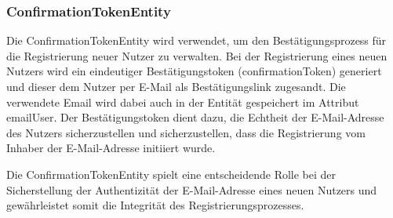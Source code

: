 \documentclass[fontsize=12pt,openright,oneside,paper=a4,BCOR=1cm]{scrbook}
\begin{document}
\subsubsection{ConfirmationTokenEntity}
Die \glqq ConfirmationTokenEntity\grqq{} wird verwendet, um den Bestätigungsprozess für die Registrierung neuer Nutzer zu verwalten. Bei der Registrierung eines neuen Nutzers wird ein eindeutiger Bestätigungstoken (\glqq confirmationToken\grqq{}) generiert und dieser dem Nutzer per E-Mail als Bestätigungslink zugesandt. Die verwendete Email wird dabei auch in der Entität gespeichert im Attribut \glqq emailUser\grqq{}. Der Bestätigungstoken dient dazu, die Echtheit der E-Mail-Adresse des Nutzers sicherzustellen und sicherzustellen, dass die Registrierung vom Inhaber der E-Mail-Adresse initiiert wurde.

Die \glqq ConfirmationTokenEntity\grqq{} spielt eine entscheidende Rolle bei der Sicherstellung der Authentizität der E-Mail-Adresse eines neuen Nutzers und gewährleistet somit die Integrität des Registrierungsprozesses.









\end{document}
